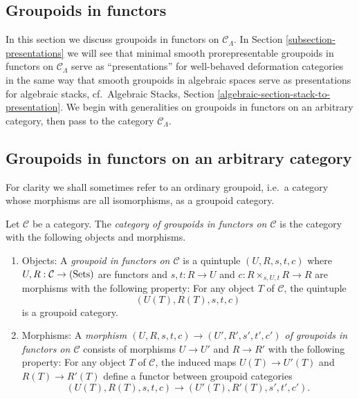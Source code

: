 \subsection{Groupoids in functors}
\label{subsection-groupoids-in-functors}
In this section we discuss groupoids in functors on $\mathcal C_{\Lambda}$.  In 
Section \ref{subsection-presentations} we will see that minimal smooth 
prorepresentable groupoids in functors on $\mathcal C_{\Lambda}$ serve as 
``presentations'' for well-behaved deformation categories in the same way that 
smooth groupoids in algebraic spaces serve as presentations for algebraic 
stacks,
cf.\ Algebraic Stacks, Section \ref{algebraic-section-stack-to-presentation}.
We begin with generalities 
on groupoids in functors on an arbitrary category, then pass to the category 
$\mathcal C_{\Lambda}$.



\subsection{Groupoids in functors on an arbitrary category}
\label{subsection-groupoids-arbitrary}

\noindent
For clarity we shall sometimes refer to an ordinary groupoid, i.e.\ a category 
whose morphisms are all isomorphisms, as a groupoid category.

\begin{definition}
\label{definition-groupoid-in-functors}
Let $\mathcal C$ be a category. The {\it category of groupoids in functors on 
$\mathcal C$} is the category with the following objects and morphisms.
\begin{enumerate}
\item Objects: A {\it groupoid in functors on $\mathcal C$} is a quintuple 
$(U,R,s,t,c)$ where $U,R: \mathcal C \rightarrow \textnormal{(Sets)}$ are 
functors and $s,t: R \rightarrow U$ and $c: R \times_{s,U,t} R \rightarrow R$ 
are morphisms with the following property: For any object $T$ of $\mathcal C$, 
the quintuple
\[ (U(T), R(T), s,t,c) \]
is a groupoid category.
\item Morphisms: A {\it morphism $(U,R,s,t,c) \rightarrow (U',R',s',t',c')$ of 
groupoids in functors on $\mathcal C$} consists of morphisms $U \rightarrow U'$ 
and $R \rightarrow R'$ with the following property: For any object $T$ of 
$\mathcal C$, the induced maps $U(T) \rightarrow U'(T)$ and $R(T) \rightarrow 
R'(T)$ define a functor between groupoid categories
\[ (U(T), R(T), s,t,c) \rightarrow (U'(T), R'(T), s',t',c') .\] 
\end{enumerate}
\end{definition}

